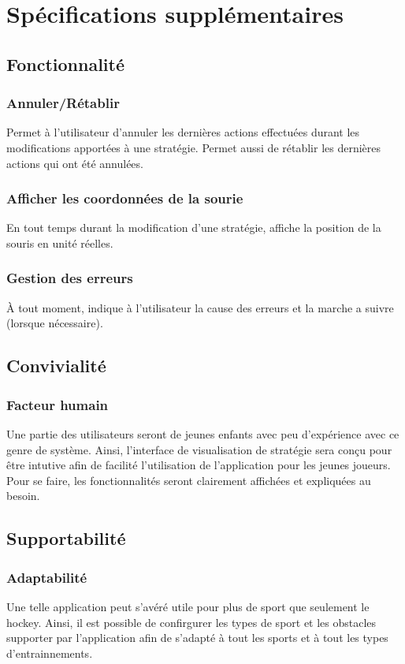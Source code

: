 \chapter{Spécifications supplémentaires}
\label{s:supplementary_specification}
\section{Fonctionnalité}

\subsection{Annuler/Rétablir}
Permet à l'utilisateur d'annuler les dernières actions effectuées durant les modifications apportées à une stratégie. Permet aussi de rétablir les dernières actions qui ont été annulées.

\subsection{Afficher les coordonnées de la sourie}
En tout temps durant la modification d'une stratégie, affiche la position de la souris en unité réelles.

\subsection{Gestion des erreurs}
À tout moment, indique à l'utilisateur la cause des erreurs et la marche a suivre (lorsque nécessaire).



\section{Convivialité}

\subsection{Facteur humain}
Une partie des utilisateurs seront de jeunes enfants avec peu d'expérience avec ce genre de système. Ainsi, l'interface de visualisation de stratégie sera conçu pour être intutive afin de facilité l'utilisation de l'application pour les jeunes joueurs. Pour se faire, les fonctionnalités seront clairement affichées et expliquées au besoin.



\section{Supportabilité}

\subsection{Adaptabilité}
Une telle application peut s'avéré utile pour plus de sport que seulement le hockey. Ainsi, il est possible de confirgurer les types de sport et les obstacles supporter par l'application afin de s'adapté à tout les sports et à tout les types d'entrainnements.








